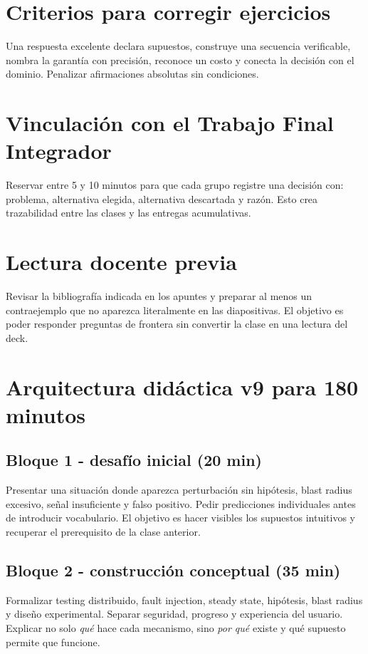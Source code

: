 \documentclass[variant=docente,cover=institutional,mode=screen]{ua-engineering-v6-article}
\begin{document}
\section{Criterios para corregir ejercicios}
Una respuesta excelente declara supuestos, construye una secuencia verificable, nombra la garantía con precisión, reconoce un costo y conecta la decisión con el dominio. Penalizar afirmaciones absolutas sin condiciones.
\section{Vinculación con el Trabajo Final Integrador}
Reservar entre 5 y 10 minutos para que cada grupo registre una decisión con: problema, alternativa elegida, alternativa descartada y razón. Esto crea trazabilidad entre las clases y las entregas acumulativas.
\section{Lectura docente previa}
Revisar la bibliografía indicada en los apuntes y preparar al menos un contraejemplo que no aparezca literalmente en las diapositivas. El objetivo es poder responder preguntas de frontera sin convertir la clase en una lectura del deck.

\section{Arquitectura didáctica v9 para 180 minutos}
\subsection*{Bloque 1 - desafío inicial (20 min)}
Presentar una situación donde aparezca perturbación sin hipótesis, blast radius excesivo, señal insuficiente y falso positivo. Pedir predicciones individuales antes de introducir vocabulario. El objetivo es hacer visibles los supuestos intuitivos y recuperar el prerequisito de la clase anterior.

\subsection*{Bloque 2 - construcción conceptual (35 min)}
Formalizar testing distribuido, fault injection, steady state, hipótesis, blast radius y diseño experimental. Separar seguridad, progreso y experiencia del usuario. Explicar no solo \emph{qué} hace cada mecanismo, sino \emph{por qué} existe y qué supuesto permite que funcione.
\end{document}
